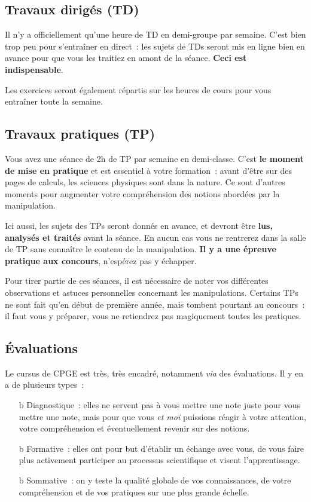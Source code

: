 \documentclass[a4paper, 10pt, garamond]{book}
\begin{document}
\subsection{Travaux dirigés (TD)}
Il n'y a officiellement qu'une heure de TD en demi-groupe par semaine. C'est
bien trop peu pour s'entraîner en direct~: les sujets de TDs seront mis en ligne
bien en avance pour que vous les traitiez en amont de la séance. \textbf{Ceci
	est indispensable}.

Les exercices seront également répartis sur les heures de cours pour vous
entraîner toute la semaine.

\subsection{Travaux pratiques (TP)}
Vous avez une séance de 2h de TP par semaine en demi-classe. C'est \textbf{le
	moment de mise en pratique} et est essentiel à votre formation~: avant d'être
sur des pages de calculs, les sciences physiques sont dans la nature. Ce sont
d'autres moments pour augmenter votre compréhension des notions abordées par la
manipulation.

Ici aussi, les sujets des TPs seront donnés en avance, et devront être
\textbf{lus, analysés et traités} avant la séance. En aucun cas vous ne
rentrerez dans la salle de TP sans connaître le contenu de la manipulation.
\textbf{Il y a une épreuve pratique aux concours}, n'espérez pas y échapper.

Pour tirer partie de ces séances, il est nécessaire de noter vos différentes
observations et astuces personnelles concernant les manipulations. Certains TPs
ne sont fait qu'en début de première année, mais tombent pourtant au concours~:
il faut vous y préparer, vous ne retiendrez pas magiquement toutes les
pratiques.

\subsection{Évaluations}
Le cursus de CPGE est très, très encadré, notamment \textit{via} des
évaluations. Il y en a de plusieurs types~:
\begin{itemize}
	\item[b]{Diagnostique}~: elles ne servent pas à vous mettre une note juste
	pour vous mettre une note, mais pour que vous \textit{et moi} puissions
	réagir à votre attention, votre compréhension et éventuellement revenir sur
	des notions.
	\item[b]{Formative}~: elles ont pour but d'établir un échange avec vous, de
	vous faire plus activement participer au processus scientifique et visent
	l'apprentissage.
	\item[b]{Sommative}~: on y teste la qualité globale de vos connaissances, de
	votre compréhension et de vos pratiques sur une plus grande échelle.
\end{itemize}
\end{document}
